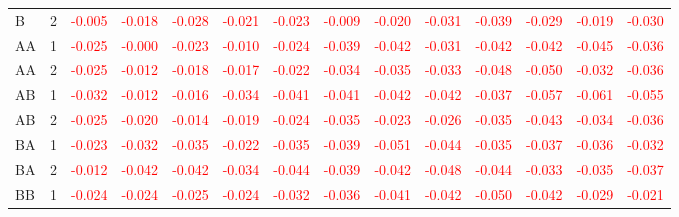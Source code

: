 \begin{table}[!htb]
{\begin{tabular}{llcccccccccccc}
B & 2 & \textcolor{red}{-0.005} & \textcolor{red}{-0.018} & \textcolor{red}{-0.028} & \textcolor{red}{-0.021} & \textcolor{red}{-0.023} & \textcolor{red}{-0.009} & \textcolor{red}{-0.020} & \textcolor{red}{-0.031} & \textcolor{red}{-0.039} & \textcolor{red}{-0.029} & \textcolor{red}{-0.019} & \textcolor{red}{-0.030}\\
AA & 1 & \textcolor{red}{-0.025} & \textcolor{red}{-0.000} & \textcolor{red}{-0.023} & \textcolor{red}{-0.010} & \textcolor{red}{-0.024} & \textcolor{red}{-0.039} & \textcolor{red}{-0.042} & \textcolor{red}{-0.031} & \textcolor{red}{-0.042} & \textcolor{red}{-0.042} & \textcolor{red}{-0.045} & \textcolor{red}{-0.036}\\
AA & 2 & \textcolor{red}{-0.025} & \textcolor{red}{-0.012} & \textcolor{red}{-0.018} & \textcolor{red}{-0.017} & \textcolor{red}{-0.022} & \textcolor{red}{-0.034} & \textcolor{red}{-0.035} & \textcolor{red}{-0.033} & \textcolor{red}{-0.048} & \textcolor{red}{-0.050} & \textcolor{red}{-0.032} & \textcolor{red}{-0.036}\\
AB & 1 & \textcolor{red}{-0.032} & \textcolor{red}{-0.012} & \textcolor{red}{-0.016} & \textcolor{red}{-0.034} & \textcolor{red}{-0.041} & \textcolor{red}{-0.041} & \textcolor{red}{-0.042} & \textcolor{red}{-0.042} & \textcolor{red}{-0.037} & \textcolor{red}{-0.057} & \textcolor{red}{-0.061} & \textcolor{red}{-0.055}\\
AB & 2 & \textcolor{red}{-0.025} & \textcolor{red}{-0.020} & \textcolor{red}{-0.014} & \textcolor{red}{-0.019} & \textcolor{red}{-0.024} & \textcolor{red}{-0.035} & \textcolor{red}{-0.023} & \textcolor{red}{-0.026} & \textcolor{red}{-0.035} & \textcolor{red}{-0.043} & \textcolor{red}{-0.034} & \textcolor{red}{-0.036}\\
BA & 1 & \textcolor{red}{-0.023} & \textcolor{red}{-0.032} & \textcolor{red}{-0.035} & \textcolor{red}{-0.022} & \textcolor{red}{-0.035} & \textcolor{red}{-0.039} & \textcolor{red}{-0.051} & \textcolor{red}{-0.044} & \textcolor{red}{-0.035} & \textcolor{red}{-0.037} & \textcolor{red}{-0.036} & \textcolor{red}{-0.032}\\
BA & 2 & \textcolor{red}{-0.012} & \textcolor{red}{-0.042} & \textcolor{red}{-0.042} & \textcolor{red}{-0.034} & \textcolor{red}{-0.044} & \textcolor{red}{-0.039} & \textcolor{red}{-0.042} & \textcolor{red}{-0.048} & \textcolor{red}{-0.044} & \textcolor{red}{-0.033} & \textcolor{red}{-0.035} & \textcolor{red}{-0.037}\\
BB & 1 & \textcolor{red}{-0.024} & \textcolor{red}{-0.024} & \textcolor{red}{-0.025} & \textcolor{red}{-0.024} & \textcolor{red}{-0.032} & \textcolor{red}{-0.036} & \textcolor{red}{-0.041} & \textcolor{red}{-0.042} & \textcolor{red}{-0.050} & \textcolor{red}{-0.042} & \textcolor{red}{-0.029} & \textcolor{red}{-0.021}\\

\end{tabular}}
\end{table}
